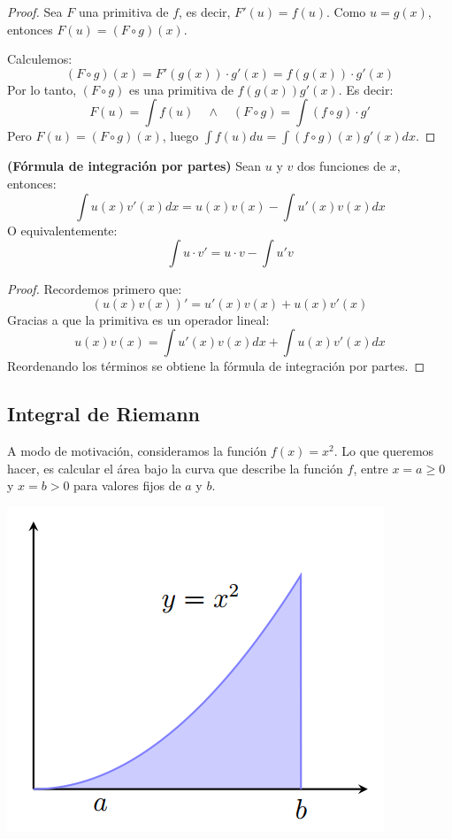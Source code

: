 \begin{proof}
	Sea $F$ una primitiva de $f$, es decir, $F'(u) = f(u)$. Como $u = g(x)$, entonces $F(u) = (F \circ g)(x)$. 
	
	Calculemos: 
	$$ (F \circ g)(x) =  F'(g(x))\cdot g'(x) = f(g(x))\cdot g'(x) $$ 
	Por lo tanto, $(F \circ g)$ es una primitiva de $f(g(x))g'(x)$. 
	Es decir: 
	$$ F(u) = \int f(u)\quad \wedge \quad (F \circ g) = \int (f \circ g ) \cdot g'$$ 
	Pero $F(u) = (F\circ g) (x)$, luego $\displaystyle \int f(u) du = \int (f \circ g) (x) g'(x) dx$. 
\end{proof}

\begin{teorema}
	\textbf{(Fórmula de integración por partes)}
	Sean $u$ y $v$ dos funciones de $x$, entonces: 
	$$ \int u(x) v'(x) dx = u(x) v(x) - \int u'(x) v(x) dx $$ 
	O equivalentemente: 
	$$ \int u \cdot v' = u \cdot v - \int u' v $$ 
\end{teorema}

\begin{proof}
	Recordemos primero que: 
	$$ (u(x)v(x))' = u'(x) v(x) + u(x) v'(x) $$
	Gracias a que la primitiva es un operador lineal: 
	$$ u(x) v(x) = \int u'(x) v(x) dx + \int u(x) v'(x) dx $$ 
	Reordenando los términos se obtiene la fórmula de integración por partes. 
\end{proof}

\subsection{Integral de Riemann}

A modo de motivación, consideramos la función $f(x) = x^2$. Lo que queremos hacer, es calcular el área bajo la curva que describe la función $f$, entre $x=a\geq 0$ y $x=b>0$ para valores fijos de $a$ y $b$. 

\begin{center}
	\includegraphics[scale=0.6]{figuras/capitulo1/06-integrales/motivacion.png}
\end{center}

